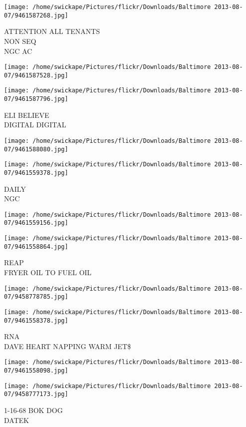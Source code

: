 \documentclass[10pt,letterpaper]{article}
\begin{document}
\vspace{0.25in}
\texttt{[image: /home/swickape/Pictures/flickr/Downloads/Baltimore 2013-08-07/9461587268.jpg]}

ATTENTION ALL TENANTS\\
NON SEQ\\
NGC AC\\
\pagebreak

\texttt{[image: /home/swickape/Pictures/flickr/Downloads/Baltimore 2013-08-07/9461587528.jpg]}

\vspace{0.25in}
\texttt{[image: /home/swickape/Pictures/flickr/Downloads/Baltimore 2013-08-07/9461587796.jpg]}

ELI BELIEVE\\
DIGITAL DIGITAL\\
\pagebreak

\texttt{[image: /home/swickape/Pictures/flickr/Downloads/Baltimore 2013-08-07/9461588080.jpg]}

\vspace{0.25in}
\texttt{[image: /home/swickape/Pictures/flickr/Downloads/Baltimore 2013-08-07/9461559378.jpg]}

DAILY\\
NGC\\
\pagebreak

\texttt{[image: /home/swickape/Pictures/flickr/Downloads/Baltimore 2013-08-07/9461559156.jpg]}

\vspace{0.25in}
\texttt{[image: /home/swickape/Pictures/flickr/Downloads/Baltimore 2013-08-07/9461558864.jpg]}

REAP\\
FRYER OIL TO FUEL OIL\\
\pagebreak

\texttt{[image: /home/swickape/Pictures/flickr/Downloads/Baltimore 2013-08-07/9458778785.jpg]}

\vspace{0.25in}
\texttt{[image: /home/swickape/Pictures/flickr/Downloads/Baltimore 2013-08-07/9461558378.jpg]}

RNA\\
DAVE HEART NAPPING WARM JET\$\\
\pagebreak

\texttt{[image: /home/swickape/Pictures/flickr/Downloads/Baltimore 2013-08-07/9461558098.jpg]}

\vspace{0.25in}
\texttt{[image: /home/swickape/Pictures/flickr/Downloads/Baltimore 2013-08-07/9458777173.jpg]}

1{-}16{-}68 BOK DOG\\
DATEK\\
\pagebreak
\end{document}
